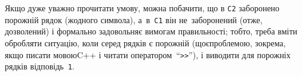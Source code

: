 Якщо дуже уважно прочитати умову, можна побачити, що в \texttt{C2} заборонено порожній рядок (жодного символа), а~в~\texttt{C1} він не~заборонений (отже, дозволений) і формально задовольняє вимогам правильності; тобто, треба вміти обробляти ситуацію, коли серед рядків є порожній (що\nolinebreak[3] є\nolinebreak[3] проблемою, зокрема, якщо писати мовою\nolinebreak[3] C++ і читати оператором~``\verb">>"''), і виводити для порожніх рядків відповідь~\texttt{1}.









